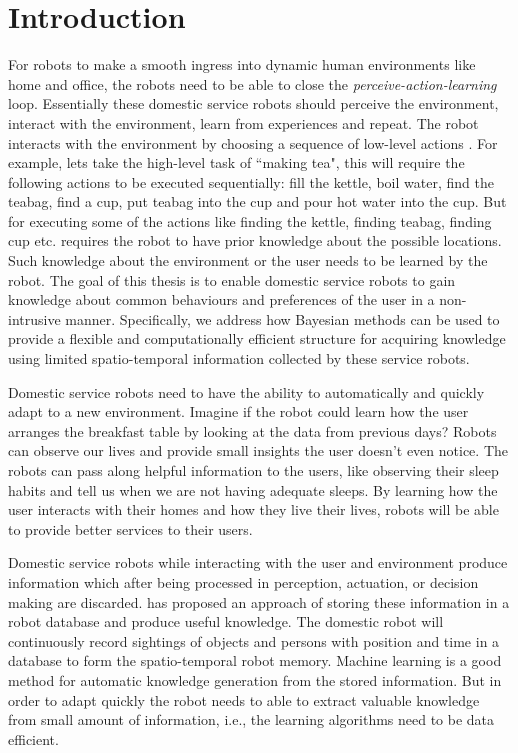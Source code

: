\chapter{Introduction}


For robots to make a smooth ingress into dynamic human environments like home and office, the robots need to be able to close the \emph{perceive-action-learning} loop. Essentially these domestic service robots should perceive the environment, interact with the environment, learn from experiences and repeat. The robot interacts with the environment by choosing a sequence of low-level actions . For example, lets take the high-level task of ``making tea", this will require the following actions to be executed sequentially: fill the kettle, boil water, find the teabag, find a cup, put teabag into the cup and pour hot water into the cup. But for executing some of the actions like finding the kettle, finding teabag, finding cup etc. requires the robot to have prior knowledge about the possible locations. Such knowledge about the environment or the user needs to be learned by the robot. The goal of this thesis is to enable domestic service robots to gain knowledge about common behaviours and preferences of the user in a non-intrusive manner. Specifically, we address how Bayesian methods can be used to provide a flexible and computationally efficient structure for acquiring knowledge using limited spatio-temporal information collected by these service robots.

Domestic service robots need to have the ability to automatically and quickly adapt to a new environment. Imagine if the robot could learn how the user arranges the breakfast table by looking at the data from previous days? Robots can observe our lives and provide small insights the user doesn't even notice. The robots can pass along helpful information to the users, like observing their sleep habits and tell us when we are not having adequate sleeps. By learning how the user interacts with their homes and how they live their lives, robots will be able to provide better services to their users. 


Domestic service robots while interacting with the user and environment produce information which after being processed in perception, actuation, or decision making are discarded. \cite{niemueller2012generic} has proposed an approach of storing these information in a robot database and produce useful knowledge. 
The domestic robot will continuously record sightings of objects and persons with position and time in a database to form the spatio-temporal robot memory. Machine learning is a good method for automatic knowledge generation from the stored information. But in order to adapt quickly the robot needs to able to extract valuable knowledge from small amount of information, i.e., the learning algorithms need to be data efficient.

